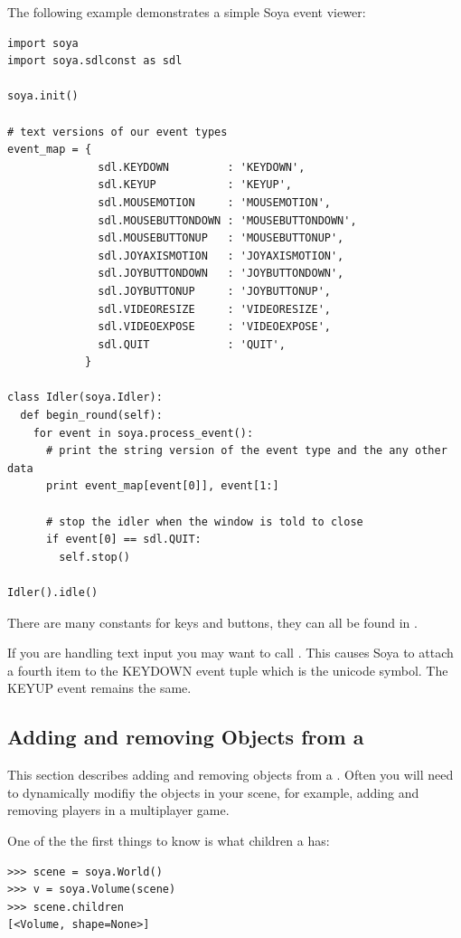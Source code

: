 The following example demonstrates a simple Soya event viewer:
\begin{verbatim}
import soya
import soya.sdlconst as sdl

soya.init()

# text versions of our event types
event_map = {
              sdl.KEYDOWN         : 'KEYDOWN',
              sdl.KEYUP           : 'KEYUP',
              sdl.MOUSEMOTION     : 'MOUSEMOTION',
              sdl.MOUSEBUTTONDOWN : 'MOUSEBUTTONDOWN',
              sdl.MOUSEBUTTONUP   : 'MOUSEBUTTONUP',
              sdl.JOYAXISMOTION   : 'JOYAXISMOTION',
              sdl.JOYBUTTONDOWN   : 'JOYBUTTONDOWN',
              sdl.JOYBUTTONUP     : 'JOYBUTTONUP',
              sdl.VIDEORESIZE     : 'VIDEORESIZE',
              sdl.VIDEOEXPOSE     : 'VIDEOEXPOSE',
              sdl.QUIT            : 'QUIT',
            }

class Idler(soya.Idler):
  def begin_round(self):
    for event in soya.process_event():
      # print the string version of the event type and the any other data
      print event_map[event[0]], event[1:]

      # stop the idler when the window is told to close
      if event[0] == sdl.QUIT:
        self.stop()

Idler().idle()

\end{verbatim}

There are many constants for keys and buttons, they can all be found in 
.

If you are handling text input you may want to call 
. This causes Soya to attach a fourth 
item to the KEYDOWN event tuple which is the unicode symbol. The KEYUP
event remains the same.

\begin{seealso}
\end{seealso}


\subsection{Adding and removing Objects from a }
This section describes adding and removing objects from a 
. Often you will need to dynamically modifiy the objects
in your scene, for example, adding and removing players in a multiplayer game. 

One of the the first things to know is what children a
 has:
\begin{verbatim}
>>> scene = soya.World()
>>> v = soya.Volume(scene)
>>> scene.children
[<Volume, shape=None>]
\end{verbatim}

